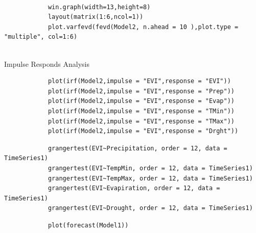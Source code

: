 \documentclass[12pt,a4paper]{book}
\begin{document}
				\begin{verbatim}
			
			win.graph(width=13,height=8)
			layout(matrix(1:6,ncol=1))
			plot.varfevd(fevd(Model2, n.ahead = 10 ),plot.type = "multiple", col=1:6)
			
				\end{verbatim}
			 Impulse Responds Analysis
				\begin{verbatim}
			plot(irf(Model2,impulse = "EVI",response = "EVI"))
			plot(irf(Model2,impulse = "EVI",response = "Prep"))
			plot(irf(Model2,impulse = "EVI",response = "Evap"))
			plot(irf(Model2,impulse = "EVI",response = "TMin"))
			plot(irf(Model2,impulse = "EVI",response = "TMax"))
			plot(irf(Model2,impulse = "EVI",response = "Drght"))
			\end{verbatim}
				\begin{verbatim}
			grangertest(EVI~Precipitation, order = 12, data = TimeSeries1)
			grangertest(EVI~TempMin, order = 12, data = TimeSeries1)
			grangertest(EVI~TempMax, order = 12, data = TimeSeries1)
			grangertest(EVI~Evapiration, order = 12, data = TimeSeries1)
			grangertest(EVI~Drought, order = 12, data = TimeSeries1)
				\end{verbatim}
	
				\begin{verbatim}
			plot(forecast(Model1))
				\end{verbatim}
			
	
\end{document}
